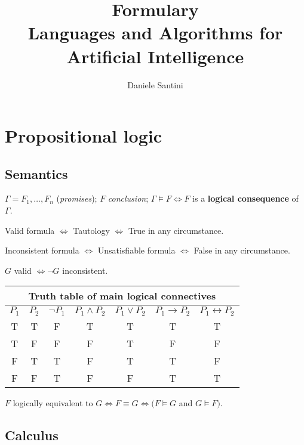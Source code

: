 \documentclass[]{article}
\title{Formulary \\ \large Languages and Algorithms for Artificial Intelligence}
\author{Daniele Santini}
\begin{document}

\section{Propositional logic}

\subsection{Semantics}

\noindent $\Gamma = F_1,\dots,F_n$ (\textit{promises});
$F$ \textit{conclusion}; 	
$\Gamma \vDash F \iff F$ is a \textbf{logical consequence} of $\Gamma$.

\noindent Valid formula $\iff$ Tautology $\iff$ True in any circumstance.

\noindent Inconsistent formula $\iff$ Unsatisfiable formula $\iff$ False in any circumstance.

\noindent $G$ valid $\iff \neg G$ inconsistent.

\begin{table}[h]
	\centering
	\begin{tabular}{ |c |c|c | c | c| c | c | } 
		\hline
		\multicolumn{7}{|c|}{Truth table of main logical connectives} \\
		\hline
		\textbf{$P_1$} & \textbf{$P_2$} & \textbf{$\neg P_1$} & \textbf{$P_1 \land P_2$} & \textbf{$P_1 \lor P_2$} & \textbf{$P_1 \rightarrow P_2$} & \textbf{$P_1 \leftrightarrow P_2$} \\
		\hline
		T & T & F & T & T & T & T \\
		\hline
		T & F & F & F & T & F & F \\
		\hline
		F & T & T & F & T & T & F \\
		\hline
		F & F & T & F & F & T & T \\
		\hline
	\end{tabular}
\end{table}

\noindent $F$ logically equivalent to $G \iff F \equiv G \iff (F \vDash G$ and $G \vDash F)$.

\subsection{Calculus}
\end{document}
